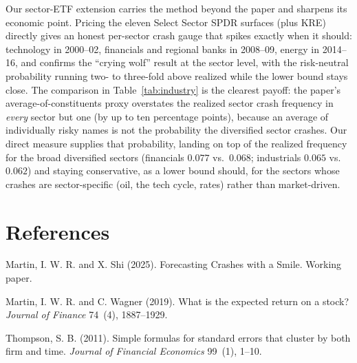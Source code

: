 \documentclass[12pt]{article}
\begin{document}
Our sector-ETF extension carries the method beyond the paper and sharpens its
economic point. Pricing the eleven Select Sector SPDR surfaces (plus KRE) directly
gives an honest per-sector crash gauge that spikes exactly when it should:
technology in 2000--02, financials and regional banks in 2008--09, energy in
2014--16, and confirms the ``crying wolf'' result at the sector level, with the
risk-neutral probability running two- to three-fold above realized while the lower
bound stays close. The comparison in Table~\ref{tab:industry} is the clearest payoff:
the paper's average-of-constituents proxy overstates the realized sector crash
frequency in \emph{every} sector but one (by up to ten percentage points), because an
average of individually risky names is not the probability the diversified sector
crashes. Our direct measure supplies that probability, landing on top of the
realized frequency for the broad diversified sectors (financials $0.077$ vs.\ $0.068$;
industrials $0.065$ vs.\ $0.062$) and staying conservative, as a lower bound should,
for the sectors whose crashes are sector-specific (oil, the tech cycle, rates) rather
than market-driven.

\clearpage
\section*{References}
\begin{list}{}{%
  \setlength{\leftmargin}{1.6em}%
  \setlength{\itemindent}{-1.6em}%
  \setlength{\itemsep}{5pt}%
  \setlength{\parsep}{0pt}}
\item Martin, I. W. R. and X. Shi (2025). Forecasting Crashes with a Smile. Working
paper.
\item Martin, I. W. R. and C. Wagner (2019). What is the expected return on a stock?
\emph{Journal of Finance} 74~(4), 1887--1929.
\item Thompson, S. B. (2011). Simple formulas for standard errors that cluster by both
firm and time. \emph{Journal of Financial Economics} 99~(1), 1--10.
\end{list}
\end{document}
